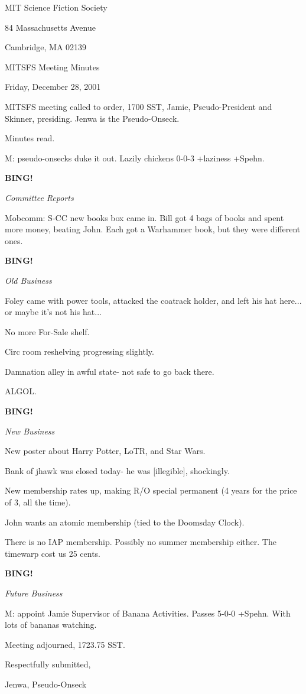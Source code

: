 \documentclass[12pt]{article}
\newcommand{\bing}{{\bf BING!} }
\newcommand{\goto}[1]{\bing \vskip 12pt \centerline{{\em{#1}}}}
\begin{document}
\begin{center}

MIT Science Fiction Society 

84 Massachusetts Avenue

Cambridge, MA 02139

\vspace{12pt}

MITSFS Meeting Minutes 

Friday, December 28, 2001

\end{center}
 
\vspace{18pt}

\setlength{\parskip}{6pt}

\noindent
MITSFS meeting called to order, 1700 SST, Jamie, Pseudo-President and Skinner, presiding. Jenwa is the Pseudo-Onseck.

Minutes read.

M: pseudo-onsecks duke it out. Lazily chickens 0-0-3 +laziness +Spehn.

\goto{Committee Reports}

Mobcomm: S-CC new books box came in. Bill got 4 bags of books and spent more money, beating John. Each got a Warhammer book, but they were different ones.

\goto{Old Business}

Foley came with power tools, attacked the coatrack holder, and left his hat here... or maybe it's not his hat...

No more For-Sale shelf.

Circ room reshelving progressing slightly.

Damnation alley in awful state- not safe to go back there.

ALGOL.

\goto{New Business}

New poster about Harry Potter, LoTR, and Star Wars.

Bank of jhawk was closed today- he was [illegible], shockingly.

New membership rates up, making R/O special permanent (4 years for the price of 3, all the time).

John wants an atomic membership (tied to the Doomsday Clock).

There is no IAP membership. Possibly no summer membership either. The timewarp cost us 25 cents.

\goto{Future Business}

M: appoint Jamie Supervisor of Banana Activities. Passes 5-0-0 +Spehn. With lots of bananas watching.

\vspace{12pt}

\noindent
Meeting adjourned, 1723.75 SST.

\vspace{18pt}

\centerline{Respectfully submitted,}
\centerline{Jenwa, Pseudo-Onseck}
\end{document}
